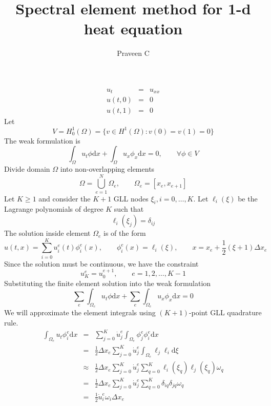 \documentclass[12pt, oneside]{article}   	%
\title{Spectral element method for 1-d heat equation}
\author{Praveen C}
\newcommand{\ud}{\textrm{d}}
\newcommand{\half}{\frac{1}{2}}
\begin{document}
\maketitle
\begin{eqnarray*}
u_t &=& u_{xx} \\
u(t,0) &=& 0 \\
u(t,1) &=& 0
\end{eqnarray*}
Let
\[
V = H^1_0(\Omega) = \{ v \in H^1(\Omega) : v(0) = v(1) = 0 \}
\]
The weak formulation is
\[
\int_\Omega u_t \phi \ud x + \int_\Omega u_x \phi_x \ud x = 0, \qquad \forall \phi \in V
\]
Divide domain $\Omega$ into non-overlapping elements
\[
\Omega = \bigcup_{e=1}^N \Omega_e, \qquad \Omega_e = [x_e, x_{e+1}]
\]
Let $K \ge 1$ and consider the $K+1$ GLL nodes $\xi_i, i=0,\ldots,K$. Let $\ell_i(\xi)$ be the Lagrange polynomials of degree $K$ such that
\[
\ell_i(\xi_j) = \delta_{ij}
\]
The solution inside element $\Omega_e$ is of the form
\[
u(t,x) = \sum_{i=0}^K u_{i}^e(t) \phi_i^e(x), \qquad \phi_i^e(x) = \ell_i(\xi), \qquad x = x_e + \half (\xi+1) \Delta x_e
\]
Since the solution must be continuous, we have the constraint
\[
u_K^e = u_0^{e+1}, \qquad e=1,2,\ldots,K-1
\]
Substituting the finite element solution into the weak formulation
\[
\sum_e \int_{\Omega_e} u_t \phi \ud x + \sum_e \int_{\Omega_e} u_x \phi_x \ud x = 0
\]
We will approximate the element integrals using $(K+1)$-point GLL quadrature rule.
\begin{eqnarray*}
\int_{\Omega_e} u_t \phi_i^e \ud x &=& \sum_{j=0}^K \dot{u}_j^e \int_{\Omega_e} \phi_j^e \phi_i^e \ud x \\
&=& \half \Delta x_e \sum_{j=0}^K \dot{u}_j^e \int_{\Omega_e} \ell_j \ell_i \ud \xi \\
&\approx& \half \Delta x_e \sum_{j=0}^K \dot{u}_j^e \sum_{q=0}^K \ell_i(\xi_q) \ell_j(\xi_q) \omega_q \\
&=& \half \Delta x_e \sum_{j=0}^K \dot{u}_j^e \sum_{q=0}^K \delta_{iq} \delta_{jq} \omega_q \\
&=& \half \dot{u}_i^e \omega_i \Delta x_e
\end{eqnarray*}
\end{document}
